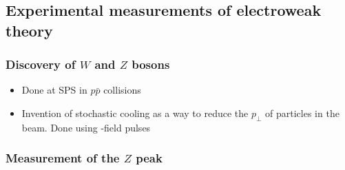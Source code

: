 \subsection{Experimental measurements of electroweak theory}
\subsubsection{Discovery of $W$ and $Z$ bosons}
\begin{itemize}
  \item Done at SPS in $p\bar p$ collisions
  \item Invention of stochastic cooling as a way to reduce the $p_\perp$ of particles in the beam. Done using \E-field pulses
\end{itemize}

\subsubsection{Measurement of the $Z$ peak}
